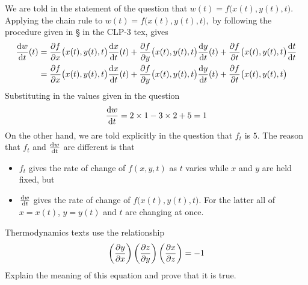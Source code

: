 \begin{solution}
We are told in the statement of the question that 
$w(t)= f\big(x(t),y(t),t\big)$.
Applying the chain rule to
$
w(t)= f\big(x(t),y(t),t\big),
$
by following the procedure given in 
\S{} in the CLP-3 tex, gives
\begin{align*}
\diff{w}{t}(t)
    &=\pdiff{f}{x}\big(x(t),y(t),t\big)\diff{x}{t}(t)
    +\pdiff{f}{y}\big(x(t),y(t),t\big)\diff{y}{t}(t)
    +\pdiff{f}{t}\big(x(t),y(t),t\big)\diff{t}{t} \\
   &=\pdiff{f}{x}\big(x(t),y(t),t\big)\diff{x}{t}(t)
    +\pdiff{f}{y}\big(x(t),y(t),t\big)\diff{y}{t}(t)
    +\pdiff{f}{t}\big(x(t),y(t),t\big)
\end{align*}
Substituting in the values given in the question
\begin{equation*}
\diff{w}{t}
    =2\times 1
    -3\times 2
    +5
    =1
\end{equation*}
On the other hand, we are told explicitly in the question that $f_t$ is $5$.
The reason that $f_t$ and $\diff{w}{t}$ are different is that
\begin{itemize}\itemsep1pt \parskip0pt  %
\item
$f_t$ gives the rate of change of $f(x,y,t)$ as $t$ varies 
while $x$ and $y$ are held fixed, but
\item
$\diff{w}{t}$ gives the rate of change of $f\big(x(t),y(t),t\big)$.
For the latter all of $x=x(t)$, $y=y(t)$ and $t$ are 
changing at once.
\end{itemize}
\end{solution}

\begin{question}
Thermodynamics texts
use the relationship 
\begin{equation*}
\left(\pdiff{y}{x}\right)
\left(\pdiff{z}{y}\right)
\left(\pdiff{x}{z}\right)=-1
\end{equation*}
Explain the meaning of this equation and prove that it is true.
\end{question}

